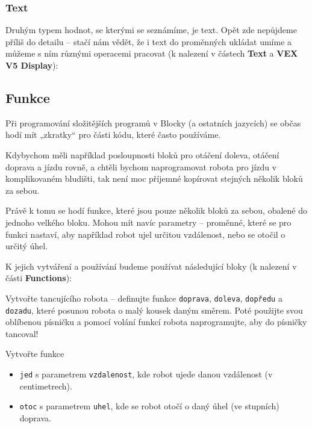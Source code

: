 \documentclass[../main.tex]{subfiles}
\begin{document}
	\subsubsection{Text}
	Druhým typem hodnot, se kterými se seznámíme, je text. Opět zde nepůjdeme příliš do detailu -- stačí nám vědět, že i text do proměnných ukládat umíme a můžeme s ním různými operacemi pracovat (k nalezení v částech \textbf{Text} a \textbf{VEX V5 Display}):

	\begin{itemize}
		\blockString
		\blockDisplayPrint
		\blockDisplayClear
	\end{itemize}

	\subsection{Funkce}
	Při programování složitějších programů v Blocky (a ostatních jazycích) se občas hodí mít „zkratky“ pro části kódu, které často používáme.

	Kdybychom měli například posloupnosti bloků pro otáčení doleva, otáčení doprava a jízdu rovně, a chtěli bychom naprogramovat robota pro jízdu v komplikovaném bludišti, tak není moc příjemné kopírovat stejných několik bloků za sebou.

	Právě k tomu se hodí funkce, které jsou pouze několik bloků za sebou, obalené do jednoho velkého bloku. Mohou mít navíc parametry -- proměnné, které se pro funkci nastaví, aby například robot ujel určitou vzdálenost, nebo se otočil o určitý úhel.

	K jejich vytváření a používání budeme používat následující bloky (k nalezení v části \textbf{Functions}):
	\begin{itemize}
		\blockFunctionDefinition
		\blockFunctionCall
	\end{itemize}

	\begin{question}
		Vytvořte tancujícího robota -- definujte funkce \texttt{doprava}, \texttt{doleva}, \texttt{dopředu} a \texttt{dozadu}, které posunou robota o malý kousek daným směrem. Poté použijte svou oblíbenou písničku a pomocí volání funkcí robota naprogramujte, aby do písničky tancoval!
	\end{question}

	\begin{question}\label{q:one}
		Vytvořte funkce
		\begin{itemize}
			\item \texttt{jed} s parametrem \texttt{vzdalenost}, kde robot ujede danou vzdálenost (v centimetrech).
			\item \texttt{otoc} s parametrem \texttt{uhel}, kde se robot otočí o daný úhel (ve stupních) doprava.
		\end{itemize}
	\end{question}
\end{document}
